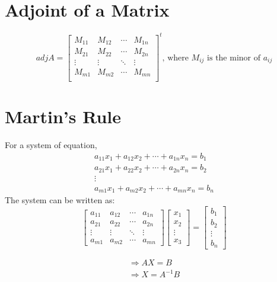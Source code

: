 \section{Adjoint of a Matrix}
\begin{equation}
	adj A=\begin{bmatrix}M_{11}&M_{12}&\cdots&M_{1n}\\ M_{21}&M_{22}&\cdots&M_{2n}\\ \vdots&\vdots&\ddots&\vdots\\M_{m1}&M_{m2}&\cdots&M_{mn}\\ \end{bmatrix}^t\text{, where } M_{ij} \text{ is the minor of } a_{ij}
\end{equation}


\section{Martin's Rule}
For a system of equation,
\begin{align}
	a_{11}x_1+a_{12}x_2+\cdots+a_{1n}x_n=b_1\nonumber\\
	a_{21}x_1+a_{22}x_2+\cdots+a_{2n}x_n=b_2\nonumber\\
	\vdots\nonumber\\
	a_{m1}x_1+a_{m2}x_2+\cdots+a_{mn}x_n=b_n\nonumber
\end{align}
The system can be written as:
\begin{equation}
	\begin{bmatrix}a_{11}&a_{12}&\cdots&a_{1n}\\a_{21}&a_{22}&\cdots&a_{2n}\\ \vdots&\vdots&\ddots&\vdots \\a_{m1}&a_{m2}&\cdots&a_{mn}\end{bmatrix} \begin{bmatrix}x_1\\x_2\\ \vdots \\ x_3\end{bmatrix}=\begin{bmatrix}b_1 \\ b_2 \\ \vdots \\ b_n\end{bmatrix}
\end{equation}

\begin{align}
	\Rightarrow AX=B\\
	\Rightarrow X=A^{-1}B
\end{align}
